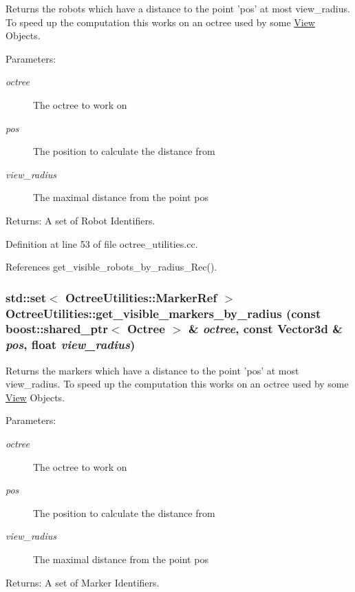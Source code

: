 Returns the robots which have a distance to the point 'pos' at most view\_\-radius. To speed up the computation this works on an octree used by some \hyperlink{class_view}{View} Objects.

\begin{Desc}
\item[Parameters:]
\begin{description}
\item[{\em octree}]The octree to work on \item[{\em pos}]The position to calculate the distance from \item[{\em view\_\-radius}]The maximal distance from the point pos\end{description}
\end{Desc}
\begin{Desc}
\item[Returns:]A set of Robot Identifiers. \end{Desc}


Definition at line 53 of file octree\_\-utilities.cc.

References get\_\-visible\_\-robots\_\-by\_\-radius\_\-Rec().\hypertarget{class_octree_utilities_ae9db0d29166f40f0691a21f7a8e2290}{
\subsubsection[get\_\-visible\_\-markers\_\-by\_\-radius]{\setlength{\rightskip}{0pt plus 5cm}std::set$<$ OctreeUtilities::MarkerRef $>$ OctreeUtilities::get\_\-visible\_\-markers\_\-by\_\-radius (const boost::shared\_\-ptr$<$ {\bf Octree} $>$ \& {\em octree}, \/  const Vector3d \& {\em pos}, \/  float {\em view\_\-radius})}}
\label{class_octree_utilities_ae9db0d29166f40f0691a21f7a8e2290}


Returns the markers which have a distance to the point 'pos' at most view\_\-radius. To speed up the computation this works on an octree used by some \hyperlink{class_view}{View} Objects.

\begin{Desc}
\item[Parameters:]
\begin{description}
\item[{\em octree}]The octree to work on \item[{\em pos}]The position to calculate the distance from \item[{\em view\_\-radius}]The maximal distance from the point pos\end{description}
\end{Desc}
\begin{Desc}
\item[Returns:]A set of Marker Identifiers. \end{Desc}


